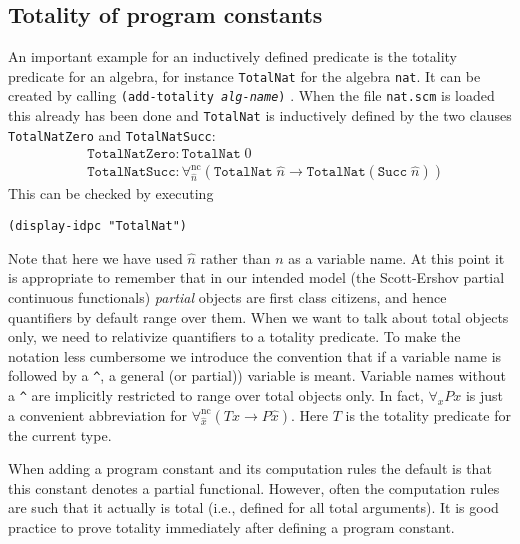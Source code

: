 \documentclass[12pt]{amsart}
\newcommand{\allnc}{\forall^{\mathrm{nc}}} %
\newcommand{\GTotal}{T} %
\begin{document}
\subsection{Totality of program constants}
\label{SS:Totality}
An important example for an inductively defined predicate is the
totality predicate for an algebra, for instance \texttt{TotalNat}%
 for the algebra \texttt{nat}.  It
can be created by calling \texttt{(add-totality \textsl{alg-name})}%
.  When the file
\texttt{nat.scm} is loaded this already has been done and
\texttt{TotalNat} is inductively defined by the two clauses
\texttt{TotalNatZero} and \texttt{TotalNatSucc}:
\begin{align*}
  &\mathtt{TotalNatZero} \colon	\mathtt{TotalNat}\; 0
  \\
  &\mathtt{TotalNatSucc} \colon
  \allnc_{\hat{n}}(\texttt{TotalNat}\; \hat{n} \to
  \texttt{TotalNat}(\texttt{Succ}\; \hat{n}))
\end{align*}
This can be checked by executing
\begin{verbatim}
(display-idpc "TotalNat")
\end{verbatim}
Note that here we have used $\hat{n}$ rather than $n$ as a variable
name.  At this point it is appropriate to remember that in our
intended model (the Scott-Ershov partial continuous functionals)
\emph{partial} objects are first class citizens, and hence quantifiers
by default range over them.  When we want to talk about total objects
only, we need to relativize quantifiers to a totality predicate.  To
make the notation less cumbersome we introduce the convention that if
a variable name is followed by a \verb#^#, a general (or
partial)) variable is meant.
Variable names without a \verb#^# are implicitly restricted to range
over total objects only.  In fact, $\forall_x P x$ is just a
convenient abbreviation for $\allnc_{\hat{x}}(\GTotal \hat{x} \to P
\hat{x})$.  Here $\GTotal$ is the totality predicate for the current
type.

When adding a program constant and its computation rules the default
is that this constant denotes a partial functional.  However,
often the computation rules are such that it actually is total (i.e.,
defined for all total arguments).  It is good practice to prove
totality immediately after defining a program constant.
\end{document}
